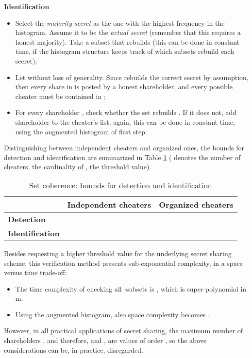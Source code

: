 \documentclass[10pt,journal,cspaper,compsoc]{IEEEtran}
\begin{document}
\textbf{Identification}

\begin{itemize}
\item{Select the \emph{majority secret}  as the one with the highest frequency in the histogram. Assume it to be the
\emph{actual secret} (remember that this requires a honest majority). Take a subset 
that rebuilds  (this can be done in constant time, if the histogram structure
keeps track of which subsets rebuild each secret)};
\item{Let  without loss of generality. Since  rebuilds the correct secret
by assumption, then every share in  is posted by a honest shareholder, and every possible cheater must be contained in
};
\item{For every shareholder , check whether the set 
rebuilds . If it does not, add shareholder  to the cheater's list; again, this can be done in constant time, using the
augmented histogram of first step.}
\end{itemize}

Distinguishing between independent cheaters and organized ones, the bounds for detection and identification are summarized
in Table \ref{table2} ( denotes the number of cheaters,  the cardinality of ,  the threshold value).
    
    \begin{table}
    \renewcommand{\arraystretch}{1.3}
     \caption{Set coherence: bounds for detection and identification}
\label{table2}
\centering
    \begin{tabular}{l|l|l}
    \hline
    ~              & \bfseries Independent cheaters &  \bfseries Organized cheaters \\ 
    \hline
    \hline
  \bfseries  Detection      &                 &             \\ \hline
 \bfseries   Identification &               &      \\ \hline
    \end{tabular}
    \end{table}

\begin{rem}
Besides requesting a higher threshold value for the underlying secret sharing scheme, this verification method presents sub-exponential complexity, in a space versus time trade-off:
\begin{itemize}
\item{The time complexity of checking all -subsets is , which is super-polynomial in m.}
\item{Using the augmented histogram, also space complexity becomes .}
\end{itemize}
However, in all practical applications of secret sharing, the maximum number of shareholders , and therefore, 
and , are values of order , so the above considerations can be, in practice, disregarded.
\end{rem}
\end{document}
